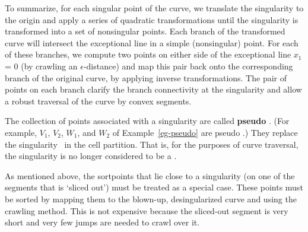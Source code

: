 To summarize, for each singular point of the curve, we translate 
the singularity to the origin
and apply a series of quadratic transformations until the singularity is 
transformed into a set of nonsingular points.
Each branch of the transformed curve will intersect the exceptional line
in a simple (nonsingular) point.
For each of these branches, we compute two points on either side of 
the exceptional line $x_{1}$= 0 (by crawling an 
\mbox{$\epsilon$-distance}) and  map this pair back onto
the corresponding branch of the original curve, by applying inverse
transformations.
The pair of points on each branch clarify the branch connectivity at the 
singularity  and allow a robust traversal of the curve by convex segments.

\begin{definition}
The collection of points associated with a singularity are called
{\bf pseudo \wallpoints}.
(For example, $V_{1}$, $V_{2}$, $W_{1}$, and $W_{2}$ of 
Example~\ref{eg-pseudo} are pseudo \wallpoints.)
They replace the singularity \wallpoint\ in the cell partition.
That is, for the purposes of curve traversal, 
the singularity is no longer considered to be a \wallpoint.
\end{definition}

As mentioned above, the sortpoints 
that lie close to a singularity (on one of the segments that is `sliced out')
must be treated as a special case.
These points must be sorted by mapping them to the blown-up, desingularized 
curve and using the crawling method.
This is not expensive because the sliced-out segment is very short and
very few jumps are needed to crawl over it.

%

